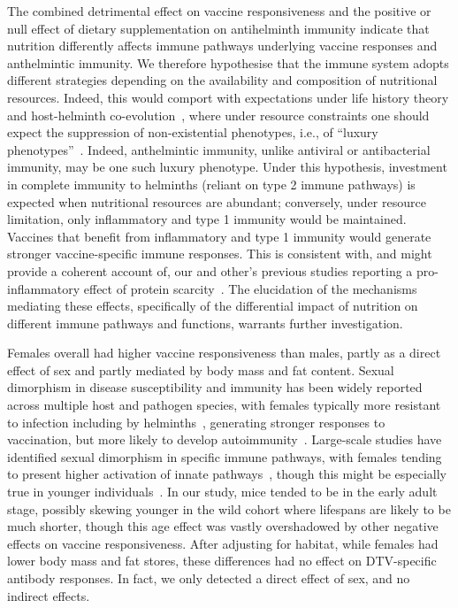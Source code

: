 \documentclass[a4paper, hidelinks, 11pt]{article}
\begin{document}
The combined detrimental effect on vaccine responsiveness and the positive or null effect of dietary supplementation on antihelminth immunity indicate that nutrition differently affects immune pathways underlying vaccine responses and anthelmintic immunity. We therefore hypothesise that the immune system adopts different strategies depending on the availability and composition of nutritional resources. Indeed, this would comport with expectations under life history theory and host-helminth co-evolution~\cite{Tate2015,Babayan2010}, where under resource constraints one should expect the suppression of non-existential phenotypes, i.e., of ``luxury phenotypes''~\cite{Geist1989}. Indeed, anthelmintic immunity, unlike antiviral or antibacterial immunity, may be one such luxury phenotype. Under this hypothesis, investment in complete immunity to helminths (reliant on type 2 immune pathways) is expected when nutritional resources are abundant; conversely, under resource limitation, only inflammatory and type 1 immunity would be maintained. Vaccines that benefit from inflammatory and type 1 immunity would generate stronger vaccine-specific immune responses. This is consistent with, and might provide a coherent account of, our and other's previous studies reporting a pro-inflammatory effect of protein scarcity~\cite{Ing2000, Coltherd2009b}. The elucidation of the mechanisms mediating these effects, specifically of the differential impact of nutrition on different immune pathways and functions, warrants further investigation.

Females overall had higher vaccine responsiveness than males, partly as a direct effect of sex and partly mediated by body mass and fat content. Sexual dimorphism in disease susceptibility and immunity has been widely reported across multiple host and pathogen species, with females typically more resistant to infection including by helminths~\cite{Klein2004}, generating stronger responses to vaccination, but more likely to develop autoimmunity~\cite{Flanagan2017,Klein2012,Hepworth2010,Scully2020,Wanelik2023}. Large-scale studies have identified sexual dimorphism in specific immune pathways, with females tending to present higher activation of innate pathways~\cite{Gal-Oz2019}, though this might be especially true in younger individuals~\cite{Marquez2020}. In our study, mice tended to be in the early adult stage, possibly skewing younger in the wild cohort where lifespans are likely to be much shorter, though this age effect was vastly overshadowed by other negative effects on vaccine responsiveness. After adjusting for habitat, while females had lower body mass and fat stores, these differences had no effect on DTV-specific antibody responses. In fact, we only detected a direct effect of sex, and no indirect effects.
\end{document}
